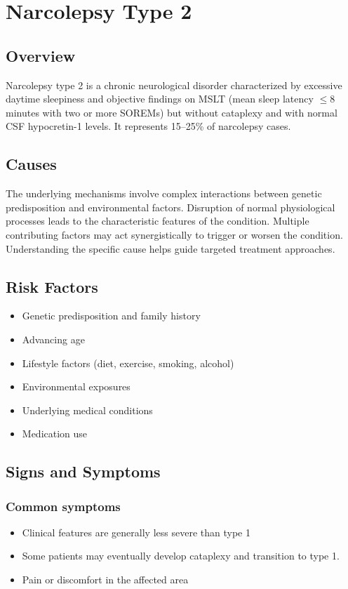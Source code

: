 \chapter{Narcolepsy Type 2}
\label{sec:Narcolepsy Type 2}

\section{Overview}
Narcolepsy type 2 is a chronic neurological disorder characterized by excessive daytime sleepiness and objective findings on MSLT (mean sleep latency $\le$8 minutes with two or more SOREMs) but without cataplexy and with normal CSF hypocretin-1 levels. It represents 15--25\% of narcolepsy cases.
\section{Causes}
The underlying mechanisms involve complex interactions between genetic predisposition and environmental factors. Disruption of normal physiological processes leads to the characteristic features of the condition. Multiple contributing factors may act synergistically to trigger or worsen the condition. Understanding the specific cause helps guide targeted treatment approaches.
\section{Risk Factors}


\begin{itemize}[noitemsep]
  \item Genetic predisposition and family history
  \item Advancing age
  \item Lifestyle factors (diet, exercise, smoking, alcohol)
  \item Environmental exposures
  \item Underlying medical conditions
  \item Medication use
\end{itemize}
\section{Signs and Symptoms}

\subsection{Common symptoms}
\begin{itemize}[noitemsep]
  \item Clinical features are generally less severe than type 1
  \item Some patients may eventually develop cataplexy and transition to type 1.
  \item Pain or discomfort in the affected area
  \end{itemize}

